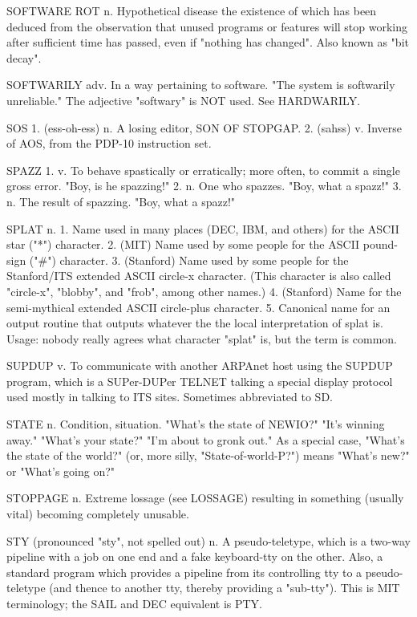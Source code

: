 SOFTWARE ROT n. Hypothetical disease the existence of which has been
   deduced from the observation that unused programs or features will
   stop working after sufficient time has passed, even if "nothing has
   changed".  Also known as "bit decay".

SOFTWARILY adv. In a way pertaining to software.  "The system is
   softwarily unreliable."  The adjective "softwary" is NOT used.  See
   HARDWARILY.

SOS 1. (ess-oh-ess) n. A losing editor, SON OF STOPGAP.	 2. (sahss) v.
   Inverse of AOS, from the PDP-10 instruction set.

SPAZZ 1. v. To behave spastically or erratically; more often, to
   commit a single gross error.	 "Boy, is he spazzing!"	 2. n. One who
   spazzes.  "Boy, what a spazz!"  3. n. The result of spazzing.
   "Boy, what a spazz!"

SPLAT n. 1. Name used in many places (DEC, IBM, and others) for the
   ASCII star ("*") character.	2. (MIT) Name used by some people for
   the ASCII pound-sign ("#") character.  3. (Stanford) Name used by
   some people for the Stanford/ITS extended ASCII circle-x character.
   (This character is also called "circle-x", "blobby", and "frob",
   among other names.)	4. (Stanford) Name for the semi-mythical
   extended ASCII circle-plus character.  5. Canonical name for an
   output routine that outputs whatever the the local interpretation
   of splat is.	 Usage: nobody really agrees what character "splat"
   is, but the term is common.

SUPDUP v. To communicate with another ARPAnet host using the SUPDUP
   program, which is a SUPer-DUPer TELNET talking a special display
   protocol used mostly in talking to ITS sites.  Sometimes
   abbreviated to SD.

STATE n. Condition, situation.	"What's the state of NEWIO?"  "It's
   winning away."  "What's your state?"	 "I'm about to gronk out."  As
   a special case, "What's the state of the world?" (or, more silly,
   "State-of-world-P?") means "What's new?" or "What's going on?"

STOPPAGE n. Extreme lossage (see LOSSAGE) resulting in something
   (usually vital) becoming completely unusable.

STY (pronounced "sty", not spelled out) n. A pseudo-teletype, which is
   a two-way pipeline with a job on one end and a fake keyboard-tty on
   the other.  Also, a standard program which provides a pipeline from
   its controlling tty to a pseudo-teletype (and thence to another
   tty, thereby providing a "sub-tty").
   This is MIT terminology; the SAIL and DEC equivalent is PTY.

